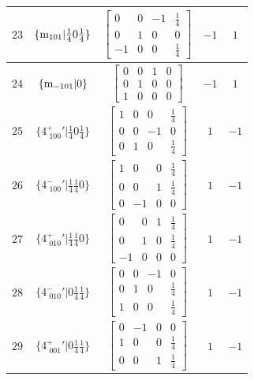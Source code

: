 \documentclass[fleqn,8pt]{jsarticle}
\begin{document}
\begin{longtable}{ccccc}
$ 23 $ & $ \{{\rm m}_{101}|\frac{1}{4} 0 \frac{1}{4}\} $ & $ \begin{bmatrix} 0 & 0 & -1 & \frac{1}{4} \\ 0 & 1 & 0 & 0 \\ -1 & 0 & 0 & \frac{1}{4} \end{bmatrix} $ & $ -1 $ & $ 1 $ \\ \hline
$ 24 $ & $ \{{\rm m}_{-101}|0\} $ & $ \begin{bmatrix} 0 & 0 & 1 & 0 \\ 0 & 1 & 0 & 0 \\ 1 & 0 & 0 & 0 \end{bmatrix} $ & $ -1 $ & $ 1 $ \\ \hline
$ 25 $ & $ \{4^{+}_{\,\,100}{}'|\frac{1}{4} 0 \frac{1}{4}\} $ & $ \begin{bmatrix} 1 & 0 & 0 & \frac{1}{4} \\ 0 & 0 & -1 & 0 \\ 0 & 1 & 0 & \frac{1}{4} \end{bmatrix} $ & $ 1 $ & $ -1 $ \\ \hline
$ 26 $ & $ \{4^{-}_{\,\,100}{}'|\frac{1}{4} \frac{1}{4} 0\} $ & $ \begin{bmatrix} 1 & 0 & 0 & \frac{1}{4} \\ 0 & 0 & 1 & \frac{1}{4} \\ 0 & -1 & 0 & 0 \end{bmatrix} $ & $ 1 $ & $ -1 $ \\ \hline
$ 27 $ & $ \{4^{+}_{\,\,010}{}'|\frac{1}{4} \frac{1}{4} 0\} $ & $ \begin{bmatrix} 0 & 0 & 1 & \frac{1}{4} \\ 0 & 1 & 0 & \frac{1}{4} \\ -1 & 0 & 0 & 0 \end{bmatrix} $ & $ 1 $ & $ -1 $ \\ \hline
$ 28 $ & $ \{4^{-}_{\,\,010}{}'|0 \frac{1}{4} \frac{1}{4}\} $ & $ \begin{bmatrix} 0 & 0 & -1 & 0 \\ 0 & 1 & 0 & \frac{1}{4} \\ 1 & 0 & 0 & \frac{1}{4} \end{bmatrix} $ & $ 1 $ & $ -1 $ \\ \hline
$ 29 $ & $ \{4^{+}_{\,\,001}{}'|0 \frac{1}{4} \frac{1}{4}\} $ & $ \begin{bmatrix} 0 & -1 & 0 & 0 \\ 1 & 0 & 0 & \frac{1}{4} \\ 0 & 0 & 1 & \frac{1}{4} \end{bmatrix} $ & $ 1 $ & $ -1 $ \\ \hline

\end{longtable}
\end{document}

